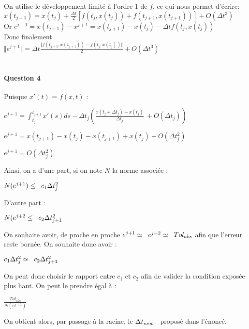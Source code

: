 \documentclass{article}
\begin{document}
On utilise le développement limité à l'ordre 1 de $f$, ce qui nous permet d'écrire: \\

$x(t_{j+1}) = x(t_{j}) + \frac{\Delta t} {2} \left[ f(t_{j}, x(t_{j})) + f(t_{j+1}, x(t_{j+1})) \right]  + O(\Delta t^{3}) $\\

Or $e^{j+1} = x(t_{j+1}) - x^{j+1} = x(t_{j+1})-x(t_{j}) - \Delta t f(t_{j}, x(t_{j}))$ \\

Donc finalement\\

$\Vert e^{j+1} \Vert = \Delta t \frac{\Vert f(t_{j+1}, x(t_{j+1})) - f(t_{j}, x(t_{j}))\Vert} {2} + O(\Delta t^{3}) $
\\
\\
\paragraph{Question 4}
Puisque $x'(t)$ = $f(x,t)$ :

$e^{j+1} = \int_{t_{j}}^{t_{j+1}} x'(s)ds - \Delta t_{j} (\frac{x(t_{j}+\Delta t_{j})-x(t_{j})}{\Delta t_{j}} \ 
+ O(\Delta t_{j})) $

$e^{j+1} = x(t_{j+1}) - x(t_{j}) - x(t_{j+1}) + x(t_{j}) + O(\Delta t_{j}^2)$

$e^{j+1} = O(\Delta t_{j}^2)$

Ainsi, on a d'une part, si on note $N$ la norme associée :

$N(e^{j+1}) \leq  \hspace{2mm} c_{1} \Delta t_{j}^2$

D'autre part :

$N(e^{j+2} \leq  \hspace{2mm} c_{2} \Delta t_{j+1}^2$

On souhaite avoir, de proche en proche $e^{j+1} \simeq \hspace{2mm} e^{j+2} \simeq \hspace{2mm} Tol_{abs}$  
afin que l'erreur reste bornée. On souhaite donc avoir :

$c_{1} \Delta t_{j}^2 \simeq \hspace{2mm} c_{2} \Delta t_{j+1}^2$


On peut donc choisir le rapport entre $c_{1}$ et $c_{2}$ afin de valider la condition exposée plus haut. 
On peut le prendre égal à :

$\frac{Tol_{abs}}{N(e^{j+1})} \ $

On obtient alors, par passage à la racine, le $\Delta t_{new} \hspace{2mm}$
proposé dans l'énoncé.
\end{document}
